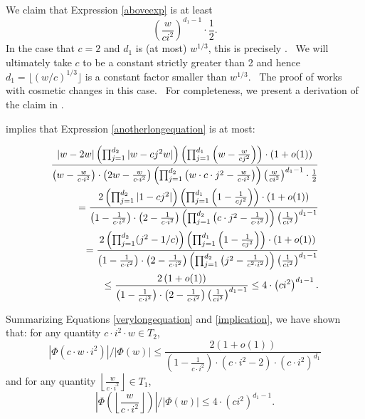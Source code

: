 \documentclass[10pt,a4paper]{article}
\newcommand{\<}{\langle}
\renewcommand{\>}{\rangle}
\begin{document}
We claim that Expression \eqref{aboveexp} is at least
\begin{equation}
\left( \frac{w}{ci^{2}}\right) ^{d_{1}-1}\cdot \frac{1}{2}.
\label{provedintheappendix}
\end{equation}
In the case that $c=2$ and $d_{1}$ is (at most) $w^{1/3}$, this is precisely
\cite[Claim 4]{zhandry}. \ We will ultimately take $c$ to be a constant
strictly greater than 2 and hence $d_{1}=\lfloor \left( w/c\right)
^{1/3}\rfloor $ is a constant factor smaller than $w^{1/3}$. \ The proof of
\cite[Claim 4]{zhandry} works with cosmetic changes in this case. \ For
completeness, we present a derivation of the claim in .

 implies that Expression \eqref{anotherlongequation} is
at most:

\begin{align}
\frac{|w-2w| \left(\prod_{j=1}^{d_2} |w - cj^2 w| \right)
\left(\prod_{j=1}^{d_1} \left( w - \frac{w}{cj^2}\right)\right) \cdot
\left(1+o(1)\right)}{ \left(w- \frac{w}{c \cdot i^2}\right) \cdot \left(2w -
\frac{w}{c \cdot i^2} \right) \left(\prod_{j=1}^{d_2} \left(w \cdot c \cdot
j^2 - \frac{w}{c \cdot i^2}\right)\right) \left(\frac{w}{ci^2}
\right)^{d_1-1} \cdot \frac{1}{2}}  \notag \\
= \frac{2 \left(\prod_{j=1}^{d_2} |1 - cj^2| \right) \left(\prod_{j=1}^{d_1}
\left(1 - \frac{1}{cj^2}\right)\right) \cdot \left(1+o(1)\right)}{ \left(1-
\frac{1}{c \cdot i^2}\right) \cdot \left(2 - \frac{1}{c \cdot i^2} \right)
\left(\prod_{j=1}^{d_2} \left(c \cdot j^2 - \frac{1}{c \cdot i^2}
\right)\right) \left(\frac{1}{ci^2}\right)^{d_1-1}}  \notag \\
= \frac{2 \left(\prod_{j=1}^{d_2} (j^2-1/c) \right) \left(\prod_{j=1}^{d_1}
\left(1 - \frac{1}{cj^2}\right)\right) \cdot \left(1+o(1)\right)}{ \left(1-
\frac{1}{c \cdot i^2}\right) \cdot \left(2 - \frac{1}{c \cdot i^2} \right)
\left(\prod_{j=1}^{d_2} \left(j^2 - \frac{1}{c^2 \cdot i^2}\right)\right)
\left(\frac{1}{ci^2}\right)^{d_1-1}}  \notag \\
\leq \frac{2 \left(1+o(1)\right)}{ \left(1- \frac{1}{c \cdot i^2}\right)
\cdot \left(2 - \frac{1}{c \cdot i^2} \right) \left(\frac{1}{ci^2}
\right)^{d_1-1}} \leq 4 \cdot \left(ci^2\right)^{d_1-1}.  \label{implication}
\end{align}

Summarizing Equations \eqref{verylongequation} and \eqref{implication}, we have shown
that: for any quantity $c \cdot i^2 \cdot w \in T_2$,
\begin{equation}  \label{keyeq1}
\left|\Phi(c \cdot w \cdot i^2)\right|/\left|\Phi(w)\right| \leq \frac{2
\left(1+o(1)\right)}{\left(1-\frac{1}{c \cdot i^2}\right) \cdot (c \cdot i^2
- 2) \cdot (c\cdot i^2)^{d_1}}
\end{equation}
and for any quantity $\left\lfloor \frac{w}{c \cdot i^2} \right\rfloor \in T_1$,
\begin{equation}  \label{keyeq2}
\left|\Phi\left( \left\lfloor \frac{w}{c \cdot i^2}\right\rfloor\right)\right|/\left|\Phi(w)
\right| \leq 4\cdot \left(ci^2\right)^{d_1-1}.
\end{equation}
\end{document}
